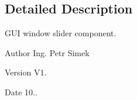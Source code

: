 \subsection{Detailed Description}
G\+UI window slider component. 

\begin{DoxyAuthor}{Author}
Ing. Petr Simek 
\end{DoxyAuthor}
\begin{DoxyVersion}{Version}
V1. 
\end{DoxyVersion}
\begin{DoxyDate}{Date}
10.. 
\end{DoxyDate}
